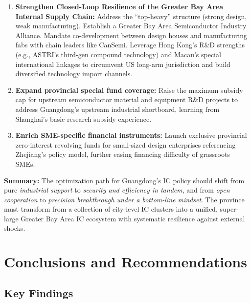\documentclass[12pt,a4paper]{article}
\begin{document}
\begin{enumerate}[label=(\arabic*)]
          reductions, maximizing talent dividends.
    \item \textbf{Strengthen Closed-Loop Resilience of the Greater Bay
          Area Internal Supply Chain:} Address the ``top-heavy''
          structure (strong design, weak manufacturing). Establish a
          Greater Bay Area Semiconductor Industry Alliance. Mandate
          co-development between design houses and manufacturing fabs
          with chain leaders like CanSemi. Leverage Hong Kong's R\&D
          strengths (e.g., ASTRI's third-gen compound technology) and
          Macau's special international linkages to circumvent US
          long-arm jurisdiction and build diversified technology import
          channels.
    \item \textbf{Expand provincial special fund coverage:} Raise the
          maximum subsidy cap for upstream semiconductor material and
          equipment R\&D projects to address Guangdong's upstream
          industrial shortboard, learning from Shanghai's basic research
          subsidy experience.
    \item \textbf{Enrich SME-specific financial instruments:} Launch
          exclusive provincial zero-interest revolving funds for
          small-sized design enterprises referencing Zhejiang's policy
          model, further easing financing difficulty of grassroots SMEs.
\end{enumerate}

\textbf{Summary:} The optimization path for Guangdong's IC policy should
shift from pure \textit{industrial support} to \textit{security and
efficiency in tandem}, and from \textit{open cooperation} to
\textit{precision breakthrough under a bottom-line mindset}. The
province must transform from a collection of city-level IC clusters
into a unified, super-large Greater Bay Area IC ecosystem with
systematic resilience against external shocks.

\section{Conclusions and Recommendations}
\label{sec:conclusion}

\subsection{Key Findings}
\label{sec:findings}
\end{document}
